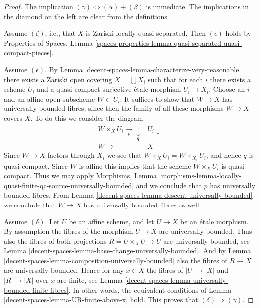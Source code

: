\begin{proof}
The implication $(\gamma) \Leftrightarrow (\alpha) + (\beta)$ is immediate.
The implications in the diamond on the left are clear from the
definitions.

\medskip\noindent
Assume $(\zeta)$, i.e., that $X$ is Zariski locally quasi-separated.
Then $(\epsilon)$ holds by
Properties of Spaces, Lemma
\ref{spaces-properties-lemma-quasi-separated-quasi-compact-pieces}.

\medskip\noindent
Assume $(\epsilon)$. By
Lemma \ref{decent-spaces-lemma-characterize-very-reasonable}
there exists
a Zariski open covering $X = \bigcup X_i$ such that for each $i$
there exists a scheme $U_i$ and a quasi-compact surjective \'etale morphism
$U_i \to X_i$. Choose an $i$ and an affine open subscheme $W \subset U_i$.
It suffices to show that $W \to X$ has universally bounded fibres, since then
the family of all these morphisms $W \to X$ covers $X$.
To do this we consider the diagram
$$
\begin{array}{cc}W \times_X U_i \underset{p}{\longrightarrow}\underset{q}{\downarrow} & U_i \downarrow \\ W \longrightarrow & X\end{array}
$$
Since $W \to X$ factors through $X_i$ we see that
$W \times_X U_i = W \times_{X_i} U_i$, and hence $q$ is quasi-compact.
Since $W$ is affine this implies that the scheme $W \times_X U_i$
is quasi-compact. Thus we may apply
Morphisms, Lemma
\ref{morphisms-lemma-locally-quasi-finite-qc-source-universally-bounded}
and we conclude that $p$ has universally bounded fibres. From
Lemma \ref{decent-spaces-lemma-descent-universally-bounded}
we conclude that $W \to X$ has universally bounded fibres as well.

\medskip\noindent
Assume $(\delta)$. Let $U$ be an affine scheme, and let $U \to X$ be an \'etale
morphism. By assumption the fibres of the morphism $U \to X$ are universally
bounded. Thus also the fibres of both projections $R = U \times_X U \to U$
are universally bounded, see
Lemma \ref{decent-spaces-lemma-base-change-universally-bounded}.
And by
Lemma \ref{decent-spaces-lemma-composition-universally-bounded}
also the fibres of $R \to X$ are universally bounded.
Hence for any $x \in X$ the fibres of $|U| \to |X|$ and $|R| \to |X|$
over $x$ are finite, see
Lemma \ref{decent-spaces-lemma-universally-bounded-finite-fibres}.
In other words, the equivalent conditions of
Lemma \ref{decent-spaces-lemma-UR-finite-above-x}
hold. This proves that $(\delta) \Rightarrow (\gamma)$.
\end{proof}

